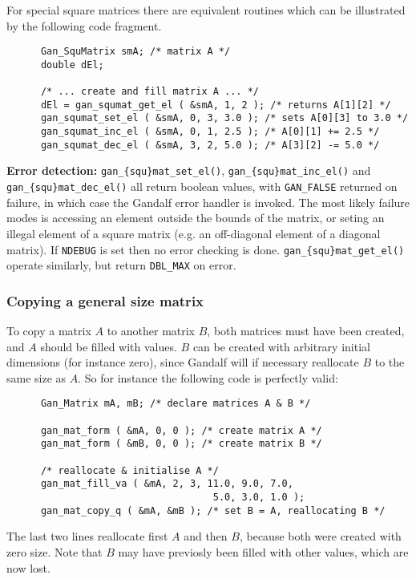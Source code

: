 For special square matrices there are equivalent routines which can be
illustrated by the following code fragment.
\begin{verbatim}
      Gan_SquMatrix smA; /* matrix A */
      double dEl;

      /* ... create and fill matrix A ... */
      dEl = gan_squmat_get_el ( &smA, 1, 2 ); /* returns A[1][2] */
      gan_squmat_set_el ( &smA, 0, 3, 3.0 ); /* sets A[0][3] to 3.0 */
      gan_squmat_inc_el ( &smA, 0, 1, 2.5 ); /* A[0][1] += 2.5 */
      gan_squmat_dec_el ( &smA, 3, 2, 5.0 ); /* A[3][2] -= 5.0 */
\end{verbatim}

{\bf Error detection:} {\tt gan\_\{squ\}mat\_set\_el()},
{\tt gan\_\{squ\}mat\_inc\_el()} and {\tt gan\_\{squ\}mat\_dec\_el()}
all return boolean values, with {\tt GAN\_FALSE}
returned on failure, in which case the Gandalf error handler is invoked.
The most likely failure modes is accessing an element outside the bounds of
the matrix, or seting an illegal element of a square matrix
(e.g. an off-diagonal element of a diagonal matrix).
If {\tt NDEBUG} is set then no error checking is done.
{\tt gan\_\{squ\}mat\_get\_el()} operate similarly, but return
{\tt DBL\_MAX} on error.

\subsubsection{Copying a general size matrix}
To copy a matrix $A$ to another matrix $B$, both matrices must have
been created, and $A$ should be filled with values. $B$ can be
created with arbitrary initial dimensions (for instance zero),
since Gandalf will
if necessary reallocate $B$ to the same size as $A$.
So for instance the following code is perfectly valid:
\begin{verbatim}
      Gan_Matrix mA, mB; /* declare matrices A & B */

      gan_mat_form ( &mA, 0, 0 ); /* create matrix A */
      gan_mat_form ( &mB, 0, 0 ); /* create matrix B */

      /* reallocate & initialise A */
      gan_mat_fill_va ( &mA, 2, 3, 11.0, 9.0, 7.0,
                                    5.0, 3.0, 1.0 );
      gan_mat_copy_q ( &mA, &mB ); /* set B = A, reallocating B */
\end{verbatim}
The last two lines reallocate first $A$ and then $B$, because both
were created with zero size. Note that $B$ may have previosly been
filled with other values, which are now lost.

